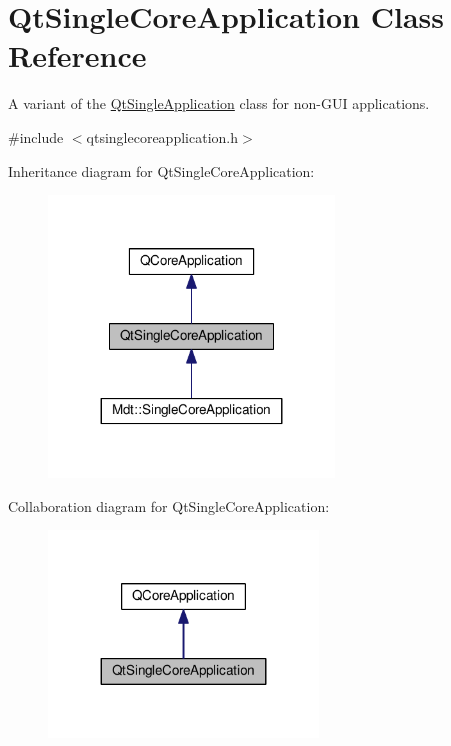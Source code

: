 \hypertarget{class_qt_single_core_application}{}\section{Qt\+Single\+Core\+Application Class Reference}
\label{class_qt_single_core_application}


A variant of the \hyperlink{class_qt_single_application}{Qt\+Single\+Application} class for non-\/\+G\+UI applications.  




{\ttfamily \#include $<$qtsinglecoreapplication.\+h$>$}



Inheritance diagram for Qt\+Single\+Core\+Application\+:
\nopagebreak
\begin{figure}[H]
\begin{center}
\leavevmode
\includegraphics[width=215pt]{class_qt_single_core_application__inherit__graph}
\end{center}
\end{figure}


Collaboration diagram for Qt\+Single\+Core\+Application\+:
\nopagebreak
\begin{figure}[H]
\begin{center}
\leavevmode
\includegraphics[width=203pt]{class_qt_single_core_application__coll__graph}
\end{center}
\end{figure}
